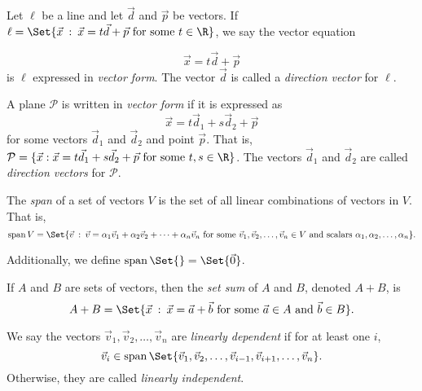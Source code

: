\begin{SaveDefinition}[key=VectorFormofaLine, title={Vector Form of a Line}]
	Let $\ell$ be a line and let $\vec d$ and $\vec p$ be vectors. If $\ell=\Set{\vec
	x\given \vec x= t\vec d+\vec p\text{ for some } t\in\R }$, we say the vector equation

	\[
		\vec x=t\vec d+\vec p
	\]
	 is $\ell$ expressed in
	\emph{vector form}. The vector $\vec d$ is called a
	\emph{direction vector} for $\ell$.
\end{SaveDefinition}

\begin{SaveDefinition}[key=VectorFormofaPlane, title={Vector Form of a Plane}]
	A plane $\mathcal P$ is written in
	\emph{vector form} if it is expressed as
	\[
		\vec x=t\vec d_{1} +s\vec d_{2}+\vec p
	\]
	 for some vectors $\vec d_{1}$ and $\vec d_{2}$ and point $\vec p$. That
	is,
	$\mathcal P = \{\vec x: \vec x= t\vec d_{1}+s\vec d_{2} +\vec p\text{ for
	some }t,s\in\R \}$. The vectors $\vec d_{1}$ and $\vec d_{2}$ are called
	\emph{direction vectors} for $\mathcal P$.
\end{SaveDefinition}

\begin{SaveDefinition}[key=Span, title={Span}]
	The
	\emph{span} of a set of vectors $V$ is the set of all linear
	combinations of vectors in $V$. That is,
	\[
		\Span V = \Set{\vec v \given \vec v=\alpha_1\vec v_1+\alpha_2\vec
		v_2 + \cdots +\alpha_n\vec v_n\text{ for some }\vec v_1,\vec v_2,\ldots,\vec
		v_n\in V \text{ and scalars }\alpha_1,\alpha_2,\ldots,\alpha_n}.
	\]

	Additionally, we define $\Span\Set{} = \Set{\vec 0}$.
\end{SaveDefinition}

\begin{SaveDefinition}[key=SetAddition, title={Set Addition}]
	If $A$ and $B$ are sets of vectors, then the
	\emph{set sum} of $A$ and $B$, denoted $A+B$, is
	\[
		A+B=\Set{\vec x \given \vec x=\vec a+\vec b\text{ for some }\vec
		a\in A\text{ and } \vec b\in B}.
	\]

\end{SaveDefinition}

\begin{SaveDefinition}[
	key=LinearlyDependentIndependentGeometric,
	title={Linearly Dependent \& Independent (Geometric)}]

	We say the vectors $\vec v_{1},\vec v_{2},\ldots,\vec v_{n}$ are
	\emph{linearly dependent} if for at least one $i$,
	\[
		\vec v_{i}\in\Span\Set{\vec v_1,\vec v_2,\ldots,\vec v_{i-1}, \vec
		v_{i+1},\ldots,\vec v_n}.
	\]
	 Otherwise, they are called
	\emph{linearly independent}.
\end{SaveDefinition}

